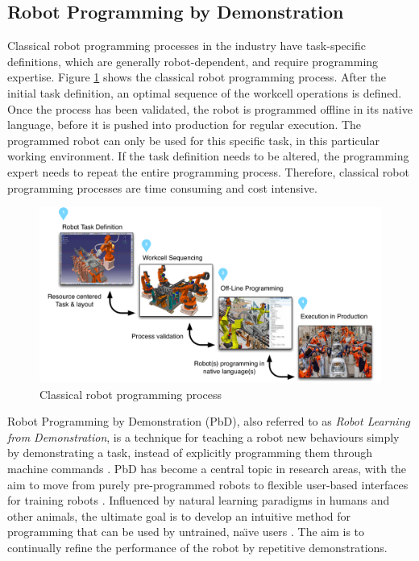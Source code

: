 \subsection{Robot Programming by Demonstration}
Classical robot programming processes in the industry have task-specific definitions, which are generally robot-dependent, and require programming expertise. Figure \ref{fig:Classical robot programming process} shows the classical robot programming process. After the initial task definition, an optimal sequence of the workcell operations is defined. Once the process has been validated, the robot is programmed offline in its native language, before it is pushed into production for regular execution. The programmed robot can only be used for this specific task, in this particular working environment. If the task definition needs to be altered, the programming expert needs to repeat the entire programming process. Therefore, classical robot programming processes are time consuming and cost intensive.

  \begin{figure}[ht]
    \centering
    \includegraphics[scale=0.4]{figures/manual-programming}
    \caption{Classical robot programming process}
    \label{fig:Classical robot programming process}
  \end{figure}

Robot Programming by Demonstration (PbD), also referred to as \textit{Robot Learning from Demonstration}, is a technique for teaching a robot new behaviours simply by demonstrating a task, instead of explicitly programming them through machine commands \cite{ghallab2004automated}.
PbD has become a central topic in research areas, with the aim to move from purely pre-programmed robots to flexible user-based interfaces for training robots \cite{billard2008robot}. Influenced by natural learning paradigms in humans and other animals, the ultimate goal is to develop an intuitive method for programming that can be used by untrained, na\"{\i}ve users \cite{suay2012practical}. The aim is to continually refine the performance of the robot by repetitive demonstrations. 


